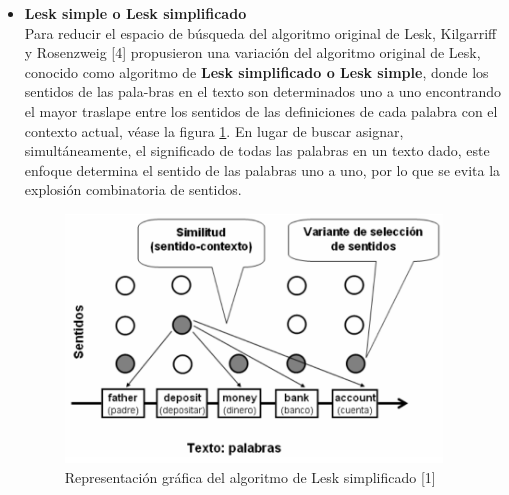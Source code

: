 \begin{itemize}
  \item \textbf{Lesk simple o Lesk simplificado} \\
    Para reducir el espacio de búsqueda del algoritmo original de Lesk, Kilgarriff y Rosenzweig [4] propusieron una variación del algoritmo original de Lesk, conocido como algoritmo de \textbf{Lesk simplificado o Lesk simple}, donde los sentidos de las pala-bras en el texto son determinados uno a uno encontrando el mayor traslape entre los sentidos de las definiciones de cada palabra con el contexto actual, véase la figura \ref{fig:lesk_simple}. En lugar de buscar asignar, simultáneamente, el significado de todas las palabras en un texto dado, este enfoque determina el sentido de las palabras uno a uno, por lo que se evita la explosión combinatoria de sentidos.

    \begin{figure}[h!]
      \begin{center}
      \includegraphics[angle=0, width=10cm]{Graficos/lesk_simple}
      \caption{Representación gráfica del algoritmo de Lesk simplificado [1]}
      \label{fig:lesk_simple}
      \end{center}
    \end{figure}


\end{itemize}
